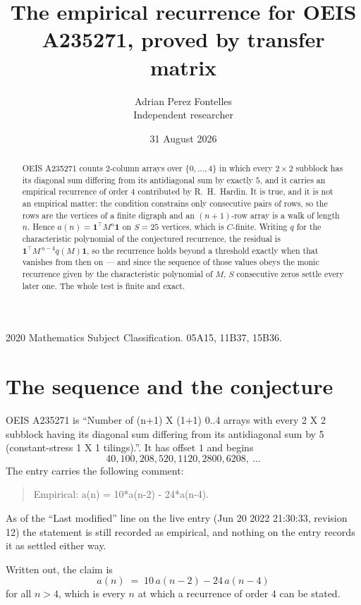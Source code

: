 \documentclass[11pt,a4paper]{article}
\title{The empirical recurrence for OEIS A235271, proved by transfer matrix}
\author{Adrian Perez Fontelles\\ \small Independent researcher}
\date{31 August 2026}
\theoremstyle{plain}
\theoremstyle{definition}
\begin{document}
\maketitle

\begin{abstract}
OEIS A235271 counts $2$-column arrays over $\{0,\dots,4\}$ in which every
$2\times2$ subblock has its diagonal sum differing from its antidiagonal sum by
exactly $5$, and it
carries an empirical recurrence of order $4$ contributed by R.~H.~Hardin. It is true,
and it is not an empirical matter: the condition constrains only consecutive pairs of rows,
so the rows are the vertices of a finite digraph and an $(n+1)$-row array is a walk of
length $n$. Hence $a(n)=\mathbf{1}^{\!\top}M^{n}\mathbf{1}$ on $S=25$ vertices, which
is $C$-finite. Writing $q$ for the characteristic polynomial of the conjectured recurrence,
the residual is $\mathbf{1}^{\!\top}M^{\,n-4}q(M)\mathbf{1}$, so the recurrence
holds beyond a threshold exactly when that vanishes from then on --- and since the sequence
of those values obeys the monic recurrence given by the characteristic polynomial of $M$,
$S$ consecutive zeros settle every later one. The whole test is finite and exact.
\end{abstract}

\noindent\small 2020 Mathematics Subject Classification. 05A15, 11B37, 15B36.\normalsize

\section{The sequence and the conjecture}

OEIS A235271 is ``Number of (n+1) X (1+1) 0..4 arrays with every 2 X 2 subblock having its diagonal sum differing from its antidiagonal sum by 5 (constant-stress 1 X 1 tilings).''. It has offset
$1$ and begins
\[
40, 100, 208, 520, 1120, 2800, 6208,\ \dots
\]
The entry carries the following comment:
\begin{quote}\small
Empirical: a(n) = 10*a(n-2) - 24*a(n-4).
\end{quote}
As of the ``Last modified'' line on the live entry (Jun 20 2022 21:30:33, revision 12) the statement is
still recorded as empirical, and nothing on the entry records it as settled either way.

Written out, the claim is
\begin{equation}\label{eq:conj}
a(n)\;=\;10\,a(n-2) - 24\,a(n-4)
\end{equation}
for all $n>4$, which is every $n$ at which a recurrence of order $4$ can be
stated.
\end{document}
